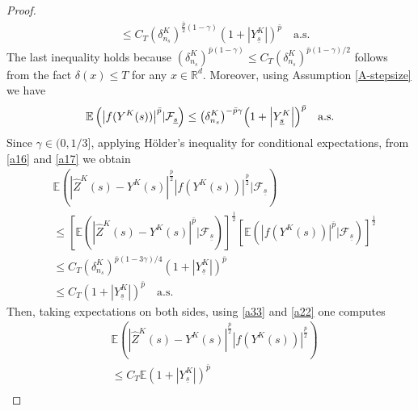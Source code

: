 \documentclass[preprint,12pt,compress]{elsarticle}
\begin{document}
\begin{proof}
\begin{equation}
\begin{split}
	&\le C_T{\left( {\delta _{{n_s}}^{K}} \right)^{\frac{{\bar p}}{2}(1 - \gamma )}}{\left( {1 + \left| {Y_{{\underline{s}}}^K} \right|} \right)^{\bar p}} \quad \text{a.s.}
\end{split}
\end{equation}
The last inequality holds because ${(\delta _{{n_s}}^K)^{\bar p(1 - \gamma )}} \le C_T{(\delta _{{n_s}}^K)^{\bar p(1 - \gamma )/2}}$ follows from the fact $\delta(x) \le T $ for any $x \in \mathbb{R}^d$.
Moreover, using Assumption \ref{A-stepsize} we have
\begin{equation}   \label{a17}
	\mathbb{E}\left( {{{\left| {f({{Y}^K}(s))} \right|}^{\bar p}}|{{\cal F}_{{\underline{s}}}}} \right) \le {\left( {\delta _{{n_s}}^{K}} \right)^{ - \bar p\gamma }}{\left( {1 + \left| {Y_{{\underline{s}}}^K} \right|} \right)^{\bar p}} \quad \text{a.s.}
\end{equation}
Since $\gamma \in (0, 1/3]$, applying H\"older's inequality for conditional expectations, from \eqref{a16} and \eqref{a17} we obtain 
\begin{equation}  \label{a27}
\begin{split}
	&\mathbb{E}\left( {{{\left| {{{\hat Z}^K}(s) - {Y^K}(s)} \right|}^{\frac{{\bar p}}{2}}}{{\left| {f({Y^K}(s))} \right|}^{\frac{{\bar p}}{2}}}|{\mathcal{F}_{{\underline{s}}}}} \right) \\
	&\le {\left[ {\mathbb{E}\left( {{{\left| {{{\hat Z}^K}(s) - {Y^K}(s)} \right|}^{\bar p}}|{\mathcal{F}_{{\underline{s}}}}} \right)} \right]^{\frac{1}{2}}}{\left[ {\mathbb{E}\left( {{{\left| {f({Y^K}(s))} \right|}^{\bar p}}|{\mathcal{F}_{{\underline{s}}}}} \right)} \right]^{\frac{1}{2}}} \\
	&\le {C_T}{\left( {\delta _{{n_s}}^K} \right)^{\bar p(1 - 3\gamma )/4}}{\left( {1 + \left| {Y_{{\underline{s}}}^K} \right|} \right)^{\bar p}} \\ 
	&\le {C_T}{\left( {1 + \left| Y_{{\underline{s}}}^K \right|} \right)^{\bar p}} \quad \text{a.s.}
\end{split}
\end{equation}
Then, taking expectations on both sides, using \eqref{a33} and \eqref{a22} one computes
\begin{equation}   \label{a12}
\begin{split}
	&\mathbb{E}\left( {{{\left| {{{\hat Z}^K}(s) - {Y^K}(s)} \right|}^{\frac{{\bar p}}{2}}}{{\left| {f({Y^K}(s))} \right|}^{\frac{{\bar p}}{2}}}} \right) \\
	&\le {C_T}\mathbb{E}{\left( {1 + \left| Y_{{\underline{s}}}^K \right|} \right)^{\bar p}} \\

\end{split}
\end{equation}
\end{proof}
\end{document}
